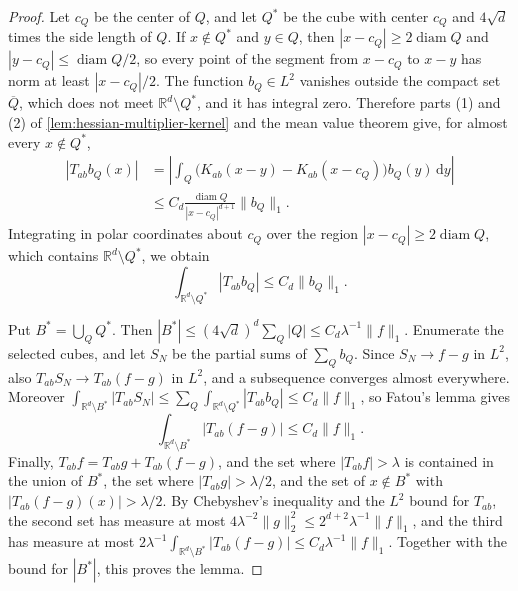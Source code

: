 \begin{proof}
Let $c_Q$ be the center of $Q$, and let $Q^*$ be the cube with center $c_Q$ and $4\sqrt d$ times the side length of $Q$. If $x\notin Q^*$ and $y\in Q$, then $|x-c_Q|\geq2\operatorname{diam}Q$ and $|y-c_Q|\leq\operatorname{diam}Q/2$, so every point of the segment from $x-c_Q$ to $x-y$ has norm at least $|x-c_Q|/2$. The function $b_Q\in L^2$ vanishes outside the compact set $\overline Q$, which does not meet $\mathbb R^d\setminus Q^*$, and it has integral zero. Therefore parts (1) and (2) of \cref{lem:hessian-multiplier-kernel} and the mean value theorem give, for almost every $x\notin Q^*$,
\[
 \begin{aligned}
 |T_{ab}b_Q(x)|
 &=\left|\int_Q\bigl(K_{ab}(x-y)-K_{ab}(x-c_Q)\bigr)b_Q(y)\,\mathrm d y\right|\\
 &\leq C_d\frac{\operatorname{diam}Q}{|x-c_Q|^{d+1}}\|b_Q\|_1.
 \end{aligned}
\]
Integrating in polar coordinates about $c_Q$ over the region $|x-c_Q|\geq2\operatorname{diam}Q$, which contains $\mathbb R^d\setminus Q^*$, we obtain
\[
 \int_{\mathbb R^d\setminus Q^*}|T_{ab}b_Q|\leq C_d\|b_Q\|_1.
\]

Put $B^*=\bigcup_QQ^*$. Then $|B^*|\leq(4\sqrt d)^d\sum_Q|Q|\leq C_d\lambda^{-1}\|f\|_1$. Enumerate the selected cubes, and let $S_N$ be the partial sums of $\sum_Qb_Q$. Since $S_N\to f-g$ in $L^2$, also $T_{ab}S_N\to T_{ab}(f-g)$ in $L^2$, and a subsequence converges almost everywhere. Moreover $\int_{\mathbb R^d\setminus B^*}|T_{ab}S_N|\leq\sum_Q\int_{\mathbb R^d\setminus Q^*}|T_{ab}b_Q|\leq C_d\|f\|_1$, so Fatou's lemma gives
\[
 \int_{\mathbb R^d\setminus B^*}|T_{ab}(f-g)|\leq C_d\|f\|_1.
\]
Finally, $T_{ab}f=T_{ab}g+T_{ab}(f-g)$, and the set where $|T_{ab}f|>\lambda$ is contained in the union of $B^*$, the set where $|T_{ab}g|>\lambda/2$, and the set of $x\notin B^*$ with $|T_{ab}(f-g)(x)|>\lambda/2$. By Chebyshev's inequality and the $L^2$ bound for $T_{ab}$, the second set has measure at most $4\lambda^{-2}\|g\|_2^2\leq2^{d+2}\lambda^{-1}\|f\|_1$, and the third has measure at most $2\lambda^{-1}\int_{\mathbb R^d\setminus B^*}|T_{ab}(f-g)|\leq C_d\lambda^{-1}\|f\|_1$. Together with the bound for $|B^*|$, this proves the lemma.
\end{proof}

